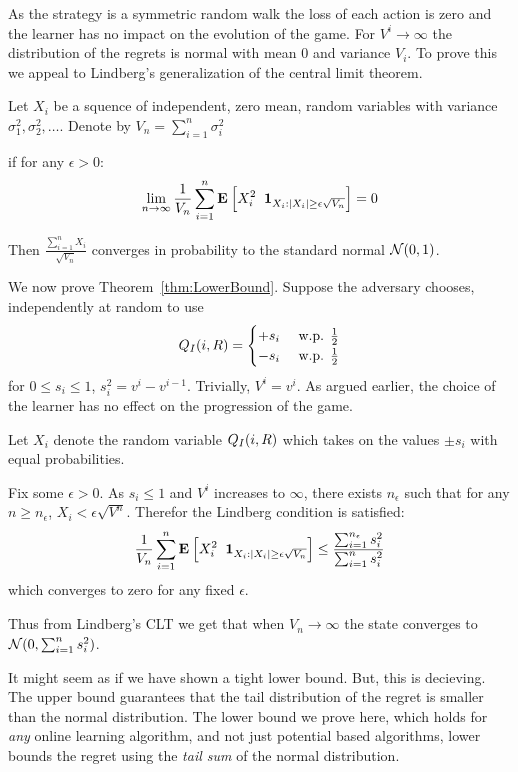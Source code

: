 \documentclass{article}[12pt]
\begin{document}
As the strategy is a symmetric random walk the loss of each action is
zero and the learner has no impact on the evolution of the game. For
$V^i \to \infty$ the distribution of the regrets is normal with mean 0
and variance $V_i$.  To prove this we appeal to Lindberg's
generalization of the central limit theorem.~\cite{billingsley1995central}
  
  \begin{theorem}
  Let $X_i$ be a squence of independent, zero mean, random variables with variance $\sigma_1^2,\sigma_2^2,\ldots$. Denote by $V_n  = \sum_{i=1}^n \sigma_i^2$

if for any $\epsilon>0$:
  \[
    \lim_{n \to \infty} \frac{1}{V_n} \sum_{i=1}^n {\bf E}_{}\left[ X_i^2 \;\;{\bf 1}_{X_i: |X_i| \geq \epsilon \sqrt{V_n}} \right]=0
  \]

 Then $\frac{\sum_{i=1}^n X_i}{\sqrt{V_n}}$ converges in probability to the standard normal ${\cal N}(0,1)$.
\end{theorem}

\noindent We now prove Theorem~\ref{thm:LowerBound}.
\proof
Suppose the adversary chooses, independently at random to use
\begin{equation}
Q_I(i,R) =
  \begin{cases}
    +s_i & \mbox{ w.p. } \frac{1}{2}\\
    -s_i & \mbox{ w.p. } \frac{1}{2}\\
  \end{cases}
\end{equation}
for $0 \leq s_i \leq 1$, $s_i^2 =  v^i - v^{i-1}$. Trivially, $V^i=v^i$. As argued earlier, the choice of the learner has no effect on the progression of the game.


Let $X_i$ denote the random variable $Q_I(i,R)$ which takes on the values $\pm s_i$ with equal probabilities.

Fix some $\epsilon>0$. As $s_i \leq 1$ and $V^i$ increases to
  $\infty$, there exists $n_{\epsilon}$ such that for any
  $n \geq n_{\epsilon}$, $X_i < \epsilon \sqrt{V^n}$. Therefor the
  Lindberg condition is satisfied:
\[
  \frac{1}{V_n}\sum_{i=1}^n {\bf E}_{}\left[ X_i^2 \;\;{\bf 1}_{X_i: |X_i| \geq \epsilon \sqrt{V_n} }  \right]
  \leq \frac{\sum_{i=1}^{n_\epsilon} s_i^2}{\sum_{i=1}^{n} s_i^2}
  \]
  which converges to zero for any fixed $\epsilon$.

  Thus from Lindberg's CLT we get that when $V_n \to \infty$ the state
  converges to ${\cal N}(0,\sum_{i=1}^n s_i^2)$.

  It might seem as if we have shown a tight lower bound. But, this is
  decieving. The upper bound guarantees that the tail
  distribution of the regret is smaller than the normal distribution.
  The lower bound we prove here, which holds for {\em any}
  online learning algorithm, and not just potential based algorithms,
  lower bounds the regret using the {\em tail sum} of the normal distribution.
\end{document}
